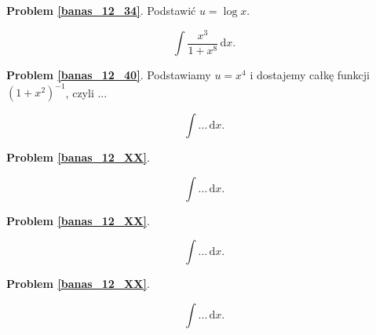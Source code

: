 \textbf{Problem \ref{banas_12_34}}.
Podstawić $u = \log x$.

\begin{problem_with_solution}
    \label{banas_12_40}%
    \begin{equation}
        \int \frac{x^3}{1+x^8} \, \mathrm{d}x.
    \end{equation}
\end{problem_with_solution}

\textbf{Problem \ref{banas_12_40}}.
Podstawiamy $u = x^4$ i dostajemy całkę funkcji $(1+x^2)^{-1}$, czyli ...

\begin{problem_with_solution}
    \label{banas_12_XX}%
    \begin{equation}
        \int \ldots \, \mathrm{d}x.
    \end{equation}
\end{problem_with_solution}

\textbf{Problem \ref{banas_12_XX}}.

\begin{problem_with_solution}
    \label{banas_12_XX}%
    \begin{equation}
        \int \ldots \, \mathrm{d}x.
    \end{equation}
\end{problem_with_solution}

\textbf{Problem \ref{banas_12_XX}}.

\begin{problem_with_solution}
    \label{banas_12_XX}%
    \begin{equation}
        \int \ldots \, \mathrm{d}x.
    \end{equation}
\end{problem_with_solution}

\textbf{Problem \ref{banas_12_XX}}.

\begin{problem_with_solution}
    \label{banas_12_XX}%
    \begin{equation}
        \int \ldots \, \mathrm{d}x.
    \end{equation}
\end{problem_with_solution}

